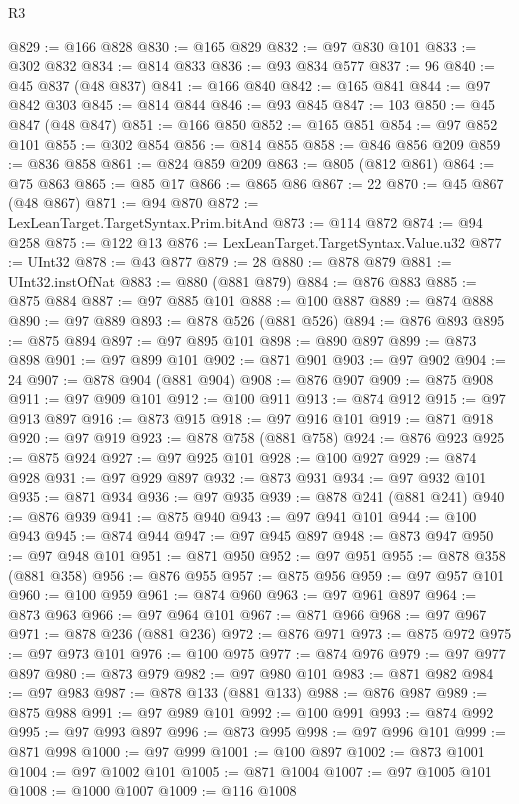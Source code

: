 \begin{lexlean}{R3}
\begin{coremodule}
@829 := @166 @828
@830 := @165 @829
@832 := @97 @830 @101
@833 := @302 @832
@834 := @814 @833
@836 := @93 @834 @577
@837 := 96
@840 := @45 @837 (@48 @837)
@841 := @166 @840
@842 := @165 @841
@844 := @97 @842 @303
@845 := @814 @844
@846 := @93 @845
@847 := 103
@850 := @45 @847 (@48 @847)
@851 := @166 @850
@852 := @165 @851
@854 := @97 @852 @101
@855 := @302 @854
@856 := @814 @855
@858 := @846 @856 @209
@859 := @836 @858
@861 := @824 @859 @209
@863 := @805 (@812 @861)
@864 := @75 @863
@865 := @85 @17
@866 := @865 @86
@867 := 22
@870 := @45 @867 (@48 @867)
@871 := @94 @870
@872 := LexLeanTarget.TargetSyntax.Prim.bitAnd
@873 := @114 @872
@874 := @94 @258
@875 := @122 @13
@876 := LexLeanTarget.TargetSyntax.Value.u32
@877 := UInt32
@878 := @43 @877
@879 := 28
@880 := @878 @879
@881 := UInt32.instOfNat
@883 := @880 (@881 @879)
@884 := @876 @883
@885 := @875 @884
@887 := @97 @885 @101
@888 := @100 @887
@889 := @874 @888
@890 := @97 @889
@893 := @878 @526 (@881 @526)
@894 := @876 @893
@895 := @875 @894
@897 := @97 @895 @101
@898 := @890 @897
@899 := @873 @898
@901 := @97 @899 @101
@902 := @871 @901
@903 := @97 @902
@904 := 24
@907 := @878 @904 (@881 @904)
@908 := @876 @907
@909 := @875 @908
@911 := @97 @909 @101
@912 := @100 @911
@913 := @874 @912
@915 := @97 @913 @897
@916 := @873 @915
@918 := @97 @916 @101
@919 := @871 @918
@920 := @97 @919
@923 := @878 @758 (@881 @758)
@924 := @876 @923
@925 := @875 @924
@927 := @97 @925 @101
@928 := @100 @927
@929 := @874 @928
@931 := @97 @929 @897
@932 := @873 @931
@934 := @97 @932 @101
@935 := @871 @934
@936 := @97 @935
@939 := @878 @241 (@881 @241)
@940 := @876 @939
@941 := @875 @940
@943 := @97 @941 @101
@944 := @100 @943
@945 := @874 @944
@947 := @97 @945 @897
@948 := @873 @947
@950 := @97 @948 @101
@951 := @871 @950
@952 := @97 @951
@955 := @878 @358 (@881 @358)
@956 := @876 @955
@957 := @875 @956
@959 := @97 @957 @101
@960 := @100 @959
@961 := @874 @960
@963 := @97 @961 @897
@964 := @873 @963
@966 := @97 @964 @101
@967 := @871 @966
@968 := @97 @967
@971 := @878 @236 (@881 @236)
@972 := @876 @971
@973 := @875 @972
@975 := @97 @973 @101
@976 := @100 @975
@977 := @874 @976
@979 := @97 @977 @897
@980 := @873 @979
@982 := @97 @980 @101
@983 := @871 @982
@984 := @97 @983
@987 := @878 @133 (@881 @133)
@988 := @876 @987
@989 := @875 @988
@991 := @97 @989 @101
@992 := @100 @991
@993 := @874 @992
@995 := @97 @993 @897
@996 := @873 @995
@998 := @97 @996 @101
@999 := @871 @998
@1000 := @97 @999
@1001 := @100 @897
@1002 := @873 @1001
@1004 := @97 @1002 @101
@1005 := @871 @1004
@1007 := @97 @1005 @101
@1008 := @1000 @1007
@1009 := @116 @1008

\end{coremodule}
\end{lexlean}
